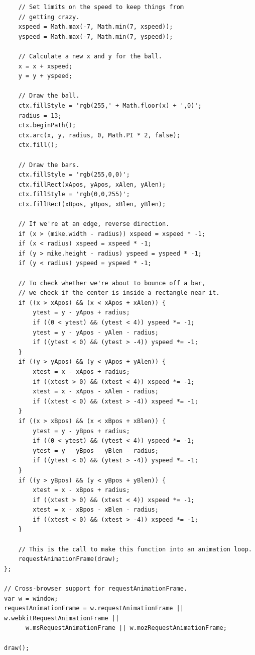 \documentclass[11pt]{article}
\begin{document}
\begin{verbatim}
    // Set limits on the speed to keep things from
    // getting crazy.
    xspeed = Math.max(-7, Math.min(7, xspeed));
    yspeed = Math.max(-7, Math.min(7, yspeed));

    // Calculate a new x and y for the ball.
    x = x + xspeed;
    y = y + yspeed;

    // Draw the ball.
    ctx.fillStyle = 'rgb(255,' + Math.floor(x) + ',0)';
    radius = 13;
    ctx.beginPath();
    ctx.arc(x, y, radius, 0, Math.PI * 2, false);
    ctx.fill();

    // Draw the bars.
    ctx.fillStyle = 'rgb(255,0,0)';
    ctx.fillRect(xApos, yApos, xAlen, yAlen);
    ctx.fillStyle = 'rgb(0,0,255)';
    ctx.fillRect(xBpos, yBpos, xBlen, yBlen);

    // If we're at an edge, reverse direction.
    if (x > (mike.width - radius)) xspeed = xspeed * -1;
    if (x < radius) xspeed = xspeed * -1;
    if (y > mike.height - radius) yspeed = yspeed * -1;
    if (y < radius) yspeed = yspeed * -1;

    // To check whether we're about to bounce off a bar,
    // we check if the center is inside a rectangle near it.
    if ((x > xApos) && (x < xApos + xAlen)) {
        ytest = y - yApos + radius;
        if ((0 < ytest) && (ytest < 4)) yspeed *= -1;
        ytest = y - yApos - yAlen - radius;
        if ((ytest < 0) && (ytest > -4)) yspeed *= -1;
    }
    if ((y > yApos) && (y < yApos + yAlen)) {
        xtest = x - xApos + radius;
        if ((xtest > 0) && (xtest < 4)) xspeed *= -1;
        xtest = x - xApos - xAlen - radius;
        if ((xtest < 0) && (xtest > -4)) xspeed *= -1;
    }
    if ((x > xBpos) && (x < xBpos + xBlen)) {
        ytest = y - yBpos + radius;
        if ((0 < ytest) && (ytest < 4)) yspeed *= -1;
        ytest = y - yBpos - yBlen - radius;
        if ((ytest < 0) && (ytest > -4)) yspeed *= -1;
    }
    if ((y > yBpos) && (y < yBpos + yBlen)) {
        xtest = x - xBpos + radius;
        if ((xtest > 0) && (xtest < 4)) xspeed *= -1;
        xtest = x - xBpos - xBlen - radius;
        if ((xtest < 0) && (xtest > -4)) xspeed *= -1;
    }

    // This is the call to make this function into an animation loop.
    requestAnimationFrame(draw);
};

// Cross-browser support for requestAnimationFrame.
var w = window;
requestAnimationFrame = w.requestAnimationFrame || w.webkitRequestAnimationFrame ||
      w.msRequestAnimationFrame || w.mozRequestAnimationFrame;

draw();
\end{verbatim}
\end{document}
